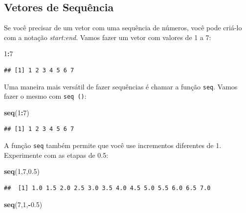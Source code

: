 \documentclass[
]{book}
\newenvironment{Shaded}{\begin{snugshade}}{\end{snugshade}}
\newcommand{\DecValTok}[1]{\textcolor[rgb]{0.00,0.00,0.81}{#1}}
\newcommand{\FloatTok}[1]{\textcolor[rgb]{0.00,0.00,0.81}{#1}}
\newcommand{\KeywordTok}[1]{\textcolor[rgb]{0.13,0.29,0.53}{\textbf{#1}}}
\newcommand{\NormalTok}[1]{#1}
\newcommand{\OperatorTok}[1]{\textcolor[rgb]{0.81,0.36,0.00}{\textbf{#1}}}
\begin{document}
\hypertarget{vetores-de-sequuxeancia}{%
\subsection{Vetores de Sequência}\label{vetores-de-sequuxeancia}}

Se você precisar de um vetor com uma sequência de números, você pode criá-lo com a notação \emph{start:end}. Vamos fazer um vetor com valores de 1 a 7:

\begin{Shaded}
\begin{Highlighting}[]
\DecValTok{1}\OperatorTok{:}\DecValTok{7}
\end{Highlighting}
\end{Shaded}

\begin{verbatim}
## [1] 1 2 3 4 5 6 7
\end{verbatim}

Uma maneira mais versátil de fazer sequências é chamar a função \texttt{seq}. Vamos fazer o mesmo com \texttt{seq\ ()}:

\begin{Shaded}
\begin{Highlighting}[]
\KeywordTok{seq}\NormalTok{(}\DecValTok{1}\OperatorTok{:}\DecValTok{7}\NormalTok{)}
\end{Highlighting}
\end{Shaded}

\begin{verbatim}
## [1] 1 2 3 4 5 6 7
\end{verbatim}

A função \texttt{seq} também permite que você use incrementos diferentes de 1. Experimente com as etapas de 0.5:

\begin{Shaded}
\begin{Highlighting}[]
\KeywordTok{seq}\NormalTok{(}\DecValTok{1}\NormalTok{,}\DecValTok{7}\NormalTok{,}\FloatTok{0.5}\NormalTok{)}
\end{Highlighting}
\end{Shaded}

\begin{verbatim}
##  [1] 1.0 1.5 2.0 2.5 3.0 3.5 4.0 4.5 5.0 5.5 6.0 6.5 7.0
\end{verbatim}

\begin{Shaded}
\begin{Highlighting}[]
\KeywordTok{seq}\NormalTok{(}\DecValTok{7}\NormalTok{,}\DecValTok{1}\NormalTok{,}\OperatorTok{-}\FloatTok{0.5}\NormalTok{) }
\end{Highlighting}
\end{Shaded}
\end{document}
